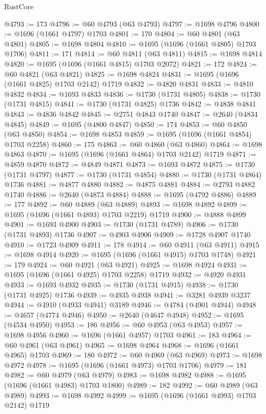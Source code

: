 \begin{lexlean}{RustCore}
\begin{coremodule}
@4793 := 173
@4796 := @60 @4793 (@63 @4793)
@4797 := @1698 @4796
@4800 := @1696 (@1661 @4797) @1703
@4801 := 170
@4804 := @60 @4801 (@63 @4801)
@4805 := @1698 @4804
@4810 := @1695 (@1696 (@1661 @4805) @1703 @1706)
@4811 := 171
@4814 := @60 @4811 (@63 @4811)
@4815 := @1698 @4814
@4820 := @1695 (@1696 (@1661 @4815) @1703 @2072)
@4821 := 172
@4824 := @60 @4821 (@63 @4821)
@4825 := @1698 @4824
@4831 := @1695 (@1696 (@1661 @4825) @1703 @2142) @1719
@4832 := @4820 @4831
@4833 := @4810 @4832
@4834 := @1693 @4833
@4836 := @1730 (@1731 @4805)
@4838 := @1730 (@1731 @4815)
@4841 := @1730 (@1731 @4825) @1736
@4842 := @4838 @4841
@4843 := @4836 @4842
@4845 := @2751 @4843 @1740
@4847 := @2640 (@4834 @4845)
@4849 := @1695 (@4800 @4847)
@4850 := 174
@4853 := @60 @4850 (@63 @4850)
@4854 := @1698 @4853
@4859 := @1695 (@1696 (@1661 @4854) @1703 @2258)
@4860 := 175
@4863 := @60 @4860 (@63 @4860)
@4864 := @1698 @4863
@4870 := @1695 (@1696 (@1661 @4864) @1703 @2142) @1719
@4871 := @4859 @4870
@4872 := @4849 @4871
@4873 := @1693 @4872
@4875 := @1730 (@1731 @4797)
@4877 := @1730 (@1731 @4854)
@4880 := @1730 (@1731 @4864) @1736
@4881 := @4877 @4880
@4882 := @4875 @4881
@4884 := @2793 @4882 @1740
@4886 := @2640 (@4873 @4884)
@4888 := @1695 (@4792 @4886)
@4889 := 177
@4892 := @60 @4889 (@63 @4889)
@4893 := @1698 @4892
@4899 := @1695 (@1696 (@1661 @4893) @1703 @2219) @1719
@4900 := @4888 @4899
@4901 := @1693 @4900
@4903 := @1730 (@1731 @4789)
@4906 := @1730 (@1731 @4893) @1736
@4907 := @4903 @4906
@4909 := @1728 @4907 @1740
@4910 := @1723 @4909
@4911 := 178
@4914 := @60 @4911 (@63 @4911)
@4915 := @1698 @4914
@4920 := @1695 (@1696 (@1661 @4915) @1703 @1748)
@4921 := 179
@4924 := @60 @4921 (@63 @4921)
@4925 := @1698 @4924
@4931 := @1695 (@1696 (@1661 @4925) @1703 @2258) @1719
@4932 := @4920 @4931
@4933 := @1693 @4932
@4935 := @1730 (@1731 @4915)
@4938 := @1730 (@1731 @4925) @1736
@4939 := @4935 @4938
@4941 := @3281 @4939 @3237
@4944 := @4910 (@4933 @4941) @3189
@4946 := @4784 (@4901 @4944)
@4948 := @4657 (@4774 @4946)
@4950 := @2640 (@4647 @4948)
@4952 := @1695 (@4534 @4950)
@4953 := 186
@4956 := @60 @4953 (@63 @4953)
@4957 := @1698 @4956
@4960 := @1696 (@1661 @4957) @1703
@4961 := 183
@4964 := @60 @4961 (@63 @4961)
@4965 := @1698 @4964
@4968 := @1696 (@1661 @4965) @1703
@4969 := 180
@4972 := @60 @4969 (@63 @4969)
@4973 := @1698 @4972
@4978 := @1695 (@1696 (@1661 @4973) @1703 @1706)
@4979 := 181
@4982 := @60 @4979 (@63 @4979)
@4983 := @1698 @4982
@4988 := @1695 (@1696 (@1661 @4983) @1703 @1800)
@4989 := 182
@4992 := @60 @4989 (@63 @4989)
@4993 := @1698 @4992
@4999 := @1695 (@1696 (@1661 @4993) @1703 @2142) @1719

\end{coremodule}
\end{lexlean}
